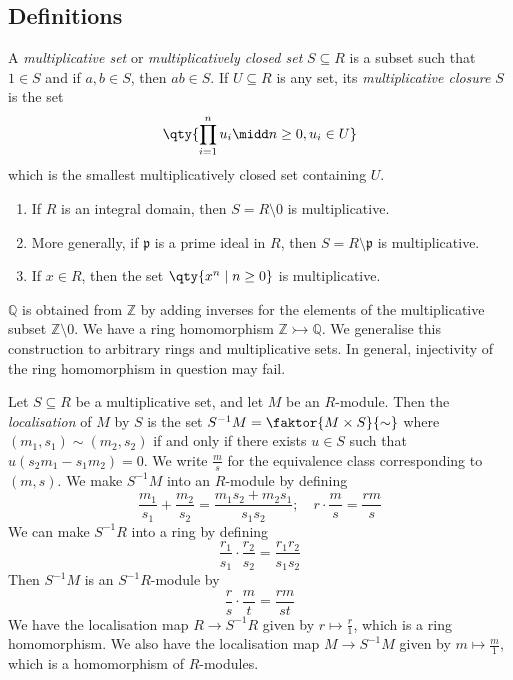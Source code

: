 \subsection{Definitions}
\begin{definition}
    A \emph{multiplicative set} or \emph{multiplicatively closed set} \( S \subseteq R \) is a subset such that \( 1 \in S \) and if \( a, b \in S \), then \( ab \in S \).
    If \( U \subseteq R \) is any set, its \emph{multiplicative closure} \( S \) is the set
    \[ \qty{\prod_{i = 1}^n u_i \midd n \geq 0, u_i \in U} \]
    which is the smallest multiplicatively closed set containing \( U \).
\end{definition}
\begin{example}
    \begin{enumerate}
        \item If \( R \) is an integral domain, then \( S = R \setminus \qty{0} \) is multiplicative.
        \item More generally, if \( \mathfrak p \) is a prime ideal in \( R \), then \( S = R \setminus \mathfrak p \) is multiplicative.
        \item If \( x \in R \), then the set \( \qty{x^n \mid n \geq 0} \) is multiplicative.
    \end{enumerate}
\end{example}
\begin{remark}
    \( \mathbb Q \) is obtained from \( \mathbb Z \) by adding inverses for the elements of the multiplicative subset \( \mathbb Z \setminus \qty{0} \).
    We have a ring homomorphism \( \mathbb Z \rightarrowtail \mathbb Q \).
    We generalise this construction to arbitrary rings and multiplicative sets.
    In general, injectivity of the ring homomorphism in question may fail.
\end{remark}
\begin{definition}
    Let \( S \subseteq R \) be a multiplicative set, and let \( M \) be an \( R \)-module.
    Then the \emph{localisation} of \( M \) by \( S \) is the set \( S^{-1} M = \faktor{M \times S}{\sim} \) where \( (m_1, s_1) \sim (m_2, s_2) \) if and only if there exists \( u \in S \) such that \( u(s_2 m_1 - s_1 m_2) = 0 \).
    We write \( \frac{m}{s} \) for the equivalence class corresponding to \( (m, s) \).
    We make \( S^{-1} M \) into an \( R \)-module by defining
    \[ \frac{m_1}{s_1} + \frac{m_2}{s_2} = \frac{m_1 s_2 + m_2 s_1}{s_1 s_2};\quad r \cdot \frac{m}{s} = \frac{rm}{s} \]
    We can make \( S^{-1} R \) into a ring by defining
    \[ \frac{r_1}{s_1} \cdot \frac{r_2}{s_2} = \frac{r_1 r_2}{s_1 s_2} \]
    Then \( S^{-1}M \) is an \( S^{-1}R \)-module by
    \[ \frac{r}{s} \cdot \frac{m}{t} = \frac{r m}{s t} \]
    We have the localisation map \( R \to S^{-1}R \) given by \( r \mapsto \frac{r}{1} \), which is a ring homomorphism.
    We also have the localisation map \( M \to S^{-1}M \) given by \( m \mapsto \frac{m}{1} \), which is a homomorphism of \( R \)-modules.
\end{definition}
